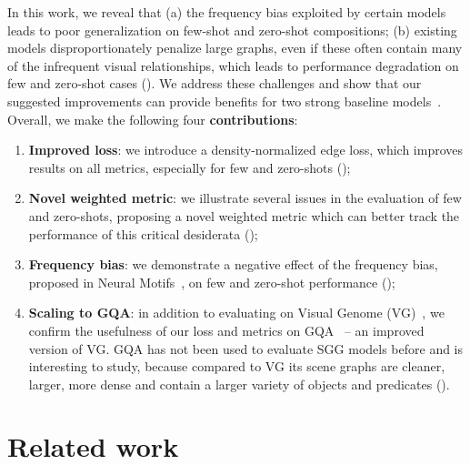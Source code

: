 In this work, we reveal that (a) the frequency bias exploited by certain  models leads to poor generalization on few-shot and zero-shot compositions; (b) existing models disproportionately penalize large graphs, even if these often contain many of the infrequent visual relationships, which leads to performance degradation on few and zero-shot cases (\fig{\ref{fig:motivation}}). We address these challenges and show that our suggested improvements can provide benefits for two strong baseline models~\citep{xu2017scene,zellers2018neural}. Overall, we make the following four \textbf{contributions}:

\begin{enumerate}[leftmargin=10pt,labelsep=2pt]
	\itemsep0em 
	\item \textbf{Improved loss}: we introduce a density-normalized edge loss, which improves results on all metrics, especially for few and zero-shots (\secref{\ref{sec:loss_norm}});
	\item \textbf{Novel weighted metric}: we illustrate several issues in the evaluation of few and zero-shots, proposing a novel weighted metric which can better track the performance of this critical desiderata (\secref{\ref{sec:metric}});
	\item \textbf{Frequency bias}: we demonstrate a negative effect of the frequency bias, proposed in Neural Motifs~\citep{zellers2018neural}, on few and zero-shot performance (\secref{\ref{sec:experiments}}); 
	\item \textbf{Scaling to GQA}: in addition to evaluating on Visual Genome (VG)~\citep{Krishna_2017}, we confirm the usefulness of our loss and metrics on GQA~\citep{hudson2019gqa} -- an improved version of VG. GQA has not been used to evaluate SGG models before and is interesting to study, because compared to VG its scene graphs are cleaner, larger, more dense and contain a larger variety of objects and predicates (\secref{\ref{sec:experiments}}).
\end{enumerate}
\vspace{-10pt}


\section{Related work}


